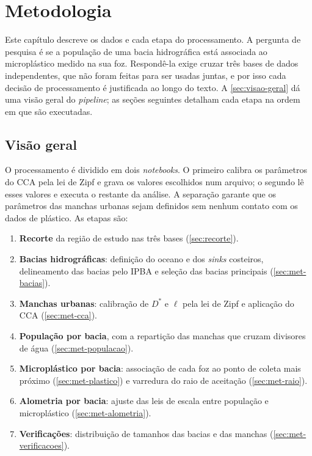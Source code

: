 \chapter{Metodologia}
\label{chap:metodologia}

Este capítulo descreve os dados e cada etapa do processamento. A pergunta de pesquisa é se a população de uma bacia hidrográfica está associada ao microplástico medido na sua foz. Respondê-la exige cruzar três bases de dados independentes, que não foram feitas para ser usadas juntas, e por isso cada decisão de processamento é justificada ao longo do texto. A \autoref{sec:visao-geral} dá uma visão geral do \textit{pipeline}; as seções seguintes detalham cada etapa na ordem em que são executadas.

\section{Visão geral}
\label{sec:visao-geral}

O processamento é dividido em dois \textit{notebooks}. O primeiro calibra os parâmetros do CCA pela lei de Zipf e grava os valores escolhidos num arquivo; o segundo lê esses valores e executa o restante da análise. A separação garante que os parâmetros das manchas urbanas sejam definidos sem nenhum contato com os dados de plástico. As etapas são:

\begin{enumerate}
	\item \textbf{Recorte} da região de estudo nas três bases (\autoref{sec:recorte}).
	\item \textbf{Bacias hidrográficas}: definição do oceano e dos \textit{sinks} costeiros, delineamento das bacias pelo IPBA e seleção das bacias principais (\autoref{sec:met-bacias}).
	\item \textbf{Manchas urbanas}: calibração de $D^{*}$ e $\ell$ pela lei de Zipf e aplicação do CCA (\autoref{sec:met-cca}).
	\item \textbf{População por bacia}, com a repartição das manchas que cruzam divisores de água (\autoref{sec:met-populacao}).
	\item \textbf{Microplástico por bacia}: associação de cada foz ao ponto de coleta mais próximo (\autoref{sec:met-plastico}) e varredura do raio de aceitação (\autoref{sec:met-raio}).
	\item \textbf{Alometria por bacia}: ajuste das leis de escala entre população e microplástico (\autoref{sec:met-alometria}).
	\item \textbf{Verificações}: distribuição de tamanhos das bacias e das manchas (\autoref{sec:met-verificacoes}).
\end{enumerate}

